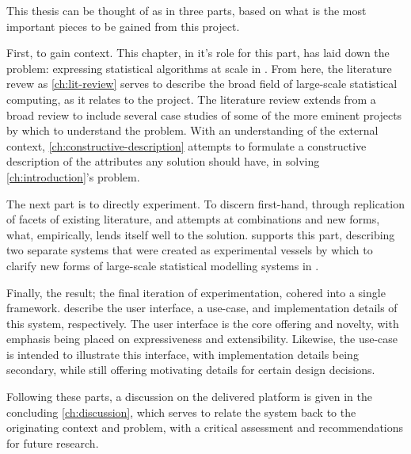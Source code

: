 This thesis can be thought of as in three parts, based on what is the most important pieces to be gained from this project.

First, to gain context.
This chapter, in it's role for this part, has laid down the problem: expressing statistical algorithms at scale in \R{}.
From here, the literature revew as \cref{ch:lit-review} serves to describe the broad field of large-scale statistical computing, as it relates to the \lsr{} project.
The literature review extends from a broad review to include several case studies of some of the more eminent projects by which to understand the problem.
With an understanding of the external context, \cref{ch:constructive-description} attempts to formulate a constructive description of the attributes any solution should have, in solving \cref{ch:introduction}'s problem.

The next part is to directly experiment.
To discern first-hand, through replication of facets of existing literature, and attempts at combinations and new forms, what, empirically, lends itself well to the solution.
 supports this part, describing two separate systems that were created as experimental vessels by which to clarify new forms of large-scale statistical modelling systems in \R{}.

Finally, the result; the final iteration of experimentation, cohered into a single \lsr{} framework.
 describe the user interface, a use-case, and implementation details of this system, respectively.
The user interface is the core offering and novelty, with emphasis being placed on expressiveness and extensibility.
Likewise, the use-case is intended to illustrate this interface, with implementation details being secondary, while still offering motivating details for certain design decisions.

Following these parts, a discussion on the delivered platform is given in the concluding \cref{ch:discussion}, which serves to relate the \lsr{} system back to the originating context and problem, with a critical assessment and recommendations for future research.
